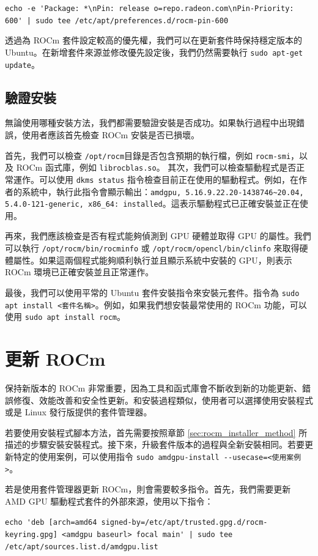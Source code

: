 \lstinline!echo -e 'Package: *\nPin: release o=repo.radeon.com\nPin-Priority: 600' | sudo tee /etc/apt/preferences.d/rocm-pin-600! 

透過為 ROCm 套件設定較高的優先權，我們可以在更新套件時保持穩定版本的 Ubuntu。在新增套件來源並修改優先設定後，我們仍然需要執行 \lstinline|sudo apt-get update|。


\subsection{驗證安裝}
無論使用哪種安裝方法，我們都需要驗證安裝是否成功。如果執行過程中出現錯誤，使用者應該首先檢查 ROCm 安裝是否已損壞。

首先，我們可以檢查 \lstinline|/opt/rocm|目錄是否包含預期的執行檔，例如 \lstinline|rocm-smi|，以及 ROCm 函式庫，例如 \lstinline|librocblas.so|。
其次，我們可以檢查驅動程式是否正常運作。可以使用 \lstinline|dkms status| 指令檢查目前正在使用的驅動程式。例如，在作者的系統中，執行此指令會顯示輸出：\lstinline|amdgpu, 5.16.9.22.20-1438746~20.04, 5.4.0-121-generic, x86_64: installed|。這表示驅動程式已正確安裝並正在使用。

再來，我們應該檢查是否有程式能夠偵測到 GPU 硬體並取得 GPU 的屬性。我們可以執行 \lstinline|/opt/rocm/bin/rocminfo| 或 \lstinline|/opt/rocm/opencl/bin/clinfo| 來取得硬體屬性。如果這兩個程式能夠順利執行並且顯示系統中安裝的 GPU，則表示 ROCm 環境已正確安裝並且正常運作。

最後，我們可以使用平常的 Ubuntu 套件安裝指令來安裝元套件。指令為 \lstinline|sudo apt install <套件名稱>|。例如，如果我們想安裝最常使用的 ROCm 功能，可以使用 \lstinline|sudo apt install rocm|。


\section{更新 ROCm}
保持新版本的 ROCm 非常重要，因為工具和函式庫會不斷收到新的功能更新、錯誤修復、效能改善和安全性更新。和安裝過程類似，使用者可以選擇使用安裝程式或是 Linux 發行版提供的套件管理器。

若要使用安裝程式腳本方法，首先需要按照章節 \ref{sec:rocm_installer_method} 所描述的步驟安裝安裝程式。接下來，升級套件版本的過程與全新安裝相同。若要更新特定的使用案例，可以使用指令 \lstinline|sudo amdgpu-install --usecase=<使用案例>|。

若是使用套件管理器更新 ROCm，則會需要較多指令。首先，我們需要更新 AMD GPU 驅動程式套件的外部來源，使用以下指令：

\lstinline!echo 'deb [arch=amd64 signed-by=/etc/apt/trusted.gpg.d/rocm-keyring.gpg] <amdgpu baseurl> focal main' | sudo tee /etc/apt/sources.list.d/amdgpu.list!

